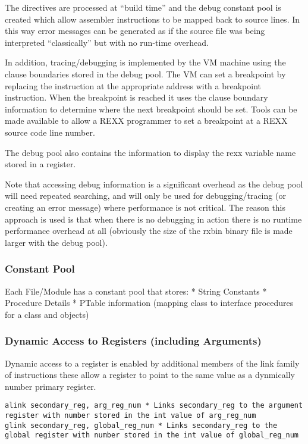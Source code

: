 The directives are processed at ``build time'' and the debug constant
pool is created which allow assembler instructions to be mapped back to
source lines. In this way error messages can be generated as if the
source file was being interpreted ``classically'' but with no run-time
overhead.

In addition, tracing/debugging is implemented by the VM machine using
the clause boundaries stored in the debug pool. The VM can set a
breakpoint by replacing the instruction at the appropriate address with
a breakpoint instruction. When the breakpoint is reached it uses the
clause boundary information to determine where the next breakpoint
should be set. Tools can be made available to allow a REXX programmer to
set a breakpoint at a REXX source code line number.

The debug pool also contains the information to display the rexx
variable name stored in a register.

Note that accessing debug information is a significant overhead as the
debug pool will need repeated searching, and will only be used for
debugging/tracing (or creating an error message) where performance is
not critical. The reason this approach is used is that when there is no
debugging in action there is no runtime performance overhead at all
(obviously the size of the rxbin binary file is made larger with the
debug pool).

\hypertarget{constant-pool}{%
\subsubsection{Constant Pool}\label{constant-pool}}

Each File/Module has a constant pool that stores: * String Constants *
Procedure Details * PTable information (mapping class to interface
procedures for a class and objects)

\hypertarget{dynamic-access-to-registers-including-arguments}{%
\subsubsection{Dynamic Access to Registers (including
Arguments)}\label{dynamic-access-to-registers-including-arguments}}

Dynamic access to a register is enabled by additional members of the
link family of instructions these allow a register to point to the same
value as a dynmically number primary register.

\begin{verbatim}
alink secondary_reg, arg_reg_num * Links secondary_reg to the argument register with number stored in the int value of arg_reg_num 
glink secondary_reg, global_reg_num * Links secondary_reg to the global register with number stored in the int value of global_reg_num 
\end{verbatim}

